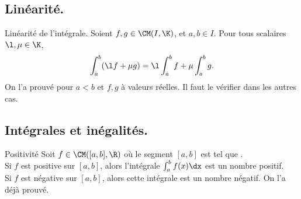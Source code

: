 \documentclass[11pt]{article}
\begin{document}
\subsection{Linéarité.}

\begin{prop}{Linéarité de l'intégrale.}{}
    Soient $f,g\in\CM(I,\K)$, et $a,b\in I$. Pour tous scalaires $\l,\mu\in\K$,
    \begin{equation*}
        \int_a^b(\l f+\mu g) = \l\int_{a}^bf+\mu\int_a^bg.
    \end{equation*}
    \tcblower
    On l'a prouvé pour $a<b$ et $f,g$ à valeurs réelles. Il faut le vérifier dans les autres cas.
\end{prop}

\subsection{Intégrales et inégalités.}
\begin{prop}{Positivité}{}
    Soit $f\in\CM([a,b],\R)$ où le segment $[a,b]$ est tel que .\\
    Si $f$ est positive sur $[a,b]$, alors l'intégrale $\int_a^bf(x)\dx$ est un nombre positif.\\
    Si $f$ est négative sur $[a,b]$, alors cette intégrale est un nombre négatif.
    \tcblower
    On l'a déjà prouvé.
\end{prop}
\end{document}
